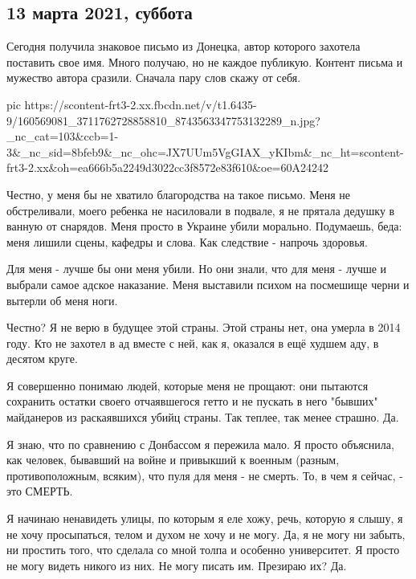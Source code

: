  
 
 
 
 
\subsection{13 марта 2021, суббота}
\label{sec:13_03_2021}

Сегодня получила знаковое письмо из Донецка, автор которого захотела поставить
свое имя. Много получаю, но не каждое публикую. Контент письма и мужество
автора сразили. Сначала пару слов скажу от себя.

\ifcmt
  pic https://scontent-frt3-2.xx.fbcdn.net/v/t1.6435-9/160569081_3711762728858810_8743563347753132289_n.jpg?_nc_cat=103&ccb=1-3&_nc_sid=8bfeb9&_nc_ohc=JX7UUm5VgGIAX_yKIbm&_nc_ht=scontent-frt3-2.xx&oh=ea666b5a2249d3022cc3f8572e83f610&oe=60A24242
\fi

Честно, у меня бы не хватило благородства на такое письмо. Меня не
обстреливали, моего ребенка не насиловали в подвале, я не прятала дедушку в
ванную от снарядов. Меня просто в Украине убили морально. Подумаешь, беда: меня
лишили сцены, кафедры и слова. Как следствие - напрочь здоровья. 

Для меня - лучше бы они меня убили. Но они знали, что для меня - лучше и
выбрали самое адское наказание. Меня выставили психом на посмешище черни и
вытерли об меня ноги. 

Честно? Я не верю в будущее этой страны. Этой страны нет, она умерла в 2014
году. Кто не захотел в ад вместе с ней, как я, оказался в ещё худшем аду, в
десятом круге. 

Я совершенно понимаю людей, которые меня не прощают: они пытаются сохранить
остатки своего отчаявшегося гетто и не пускать в него "бывших" майданеров из
раскаявшихся убийц страны. Так теплее, так менее страшно. Да.

Я знаю, что по сравнению с Донбассом я пережила мало. Я просто объяснила, как
человек, бывавший на войне и привыкший к военным (разным, противоположным,
всяким), что пуля для меня - не смерть. То, в чем я сейчас, - это СМЕРТЬ. 

Я начинаю ненавидеть улицы, по которым я еле хожу, речь, которую я слышу, я не
хочу просыпаться, телом и духом не хочу и не могу. Да, я не могу ни забыть, ни
простить того, что сделала со мной толпа и особенно университет. Я просто не
могу видеть никого из них. Не могу писать им. Презираю их? Да. 

